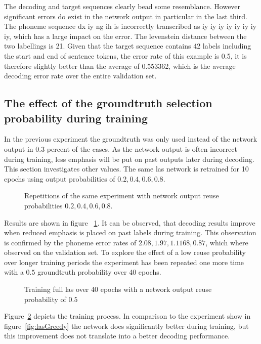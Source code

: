 The decoding and target sequences clearly bead some resemblance. However significant errors do exist in the network output in particular in the last third. The phoneme sequence dx  iy  ng  ih is incorrectly transcribed as iy  iy  iy  iy  iy  iy  iy iy,
which has a large impact on the error. The levenstein distance between the two labellings is 21. Given that the target sequence contains 42 labels including the start and end of sentence tokens, the error rate of this example is 0.5, it is therefore slightly better than the average of 0.553362, which is the average decoding error rate over the entire validation set.


\subsection{The effect of the groundtruth selection probability during training}
In the previous experiment the groundtruth was only used instead of the network output in 0.3 percent of the cases. As the network output is often incorrect during training, less emphasis will be put on past outputs later during decoding. This section investigates
other values. The same las network is retrained for 10 epochs using output probabilities of $0.2,0.4,0.6,0.8$.
\begin{figure}




\caption{Repetitions of the same experiment with network output reuse probabilities $0.2, 0.4, 0.6, 0.8$. }
\label{fig:lasGreedy2468}
\end{figure}
Results are shown in figure ~\ref{fig:lasGreedy2468}. It can be observed, that decoding results improve when reduced emphasis is placed on past labels during training. This observation is confirmed by the phoneme error rates of $2.08, 1.97, 1.1168, 0.87$, which where observed on the validation set.
To explore the effect of a low reuse probability over longer training periods the experiment has been repeated one more time with a $0.5$ groundtruth probability over 40 epochs.
\begin{figure}


\caption{Training full las over 40 epochs with a network output reuse probability of $0.5$}
\label{fig:lasGreedy05}
\end{figure}
Figure~\ref{fig:lasGreedy05} depicts the training process. In comparison to the experiment show in figure~\ref{fig:lasGreedy} the network does significantly better during training, but
this improvement does not translate into a better decoding performance.

